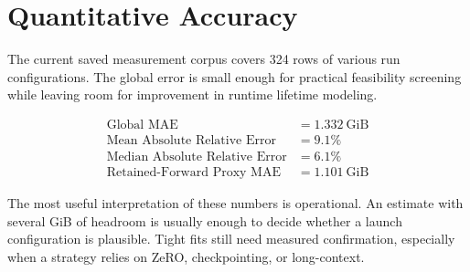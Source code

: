 \section{Quantitative Accuracy}
The current saved measurement corpus covers 324 rows of various run configurations. The global error is small enough for practical feasibility screening while leaving room for improvement in runtime lifetime modeling.

\begin{align*}
\text{Global MAE} &= 1.332\ \mathrm{GiB} \\
\text{Mean Absolute Relative Error} &= 9.1\% \\
\text{Median Absolute Relative Error} &= 6.1\% \\
\text{Retained-Forward Proxy MAE} &= 1.101\ \mathrm{GiB}
\end{align*}

The most useful interpretation of these numbers is operational. An estimate
with several GiB of headroom is usually enough to decide whether a launch
configuration is plausible. Tight fits still need measured confirmation,
especially when a strategy relies on ZeRO, checkpointing, or long-context.

